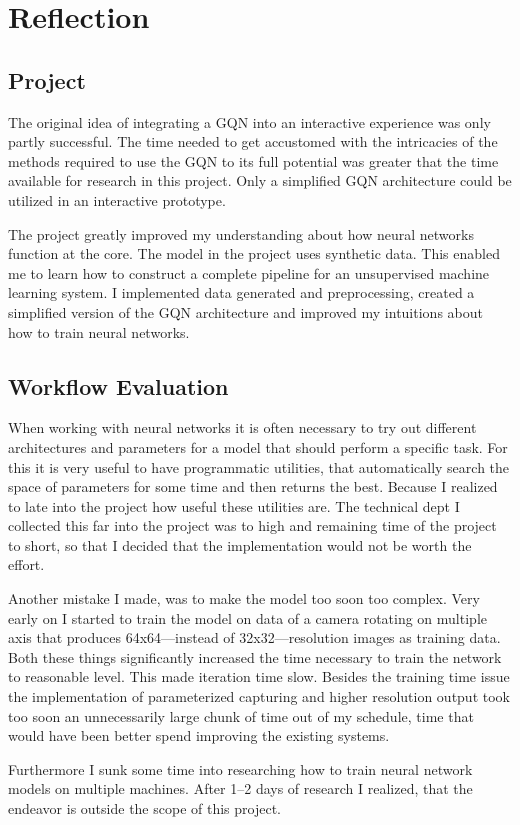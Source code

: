 
\chapter{Reflection}
\section{Project}
The original idea of integrating a GQN into an interactive experience was only partly successful. The time needed to get accustomed with the intricacies of the methods required to use the GQN to its full potential was greater that the time available for research in this project. Only a simplified GQN architecture could be utilized in an interactive prototype.

The project greatly improved my understanding about how neural networks function at the core. The model in the project uses synthetic data. This enabled me to learn how to construct a complete pipeline for an unsupervised machine learning system. I implemented data generated and preprocessing, created a simplified version of the GQN architecture and improved my intuitions about how to train neural networks.

\section{Workflow Evaluation}
When working with neural networks it is often necessary to try out different architectures and parameters for a model that should perform a specific task. For this it is very useful to have programmatic utilities, that automatically search the space of parameters for some time and then returns the best. Because I realized to late into the project how useful these utilities are. The technical dept I collected this far into the project was to high and remaining time of the project to short, so that I decided that the implementation would not be worth the effort.

Another mistake I made, was to make the model too soon too complex. Very early on I started to train the model on data of a camera rotating on multiple axis that produces 64x64---instead of 32x32---resolution images as training data. Both these things significantly increased the time necessary to train the network to reasonable level. This made iteration time slow. Besides the training time issue the implementation of parameterized capturing and higher resolution output took too soon an unnecessarily large chunk of time out of my schedule, time that would have been better spend improving the existing systems.

Furthermore I sunk some time into researching how to train neural network models on multiple machines. After 1--2 days of research I realized, that the endeavor is outside the scope of this project.
